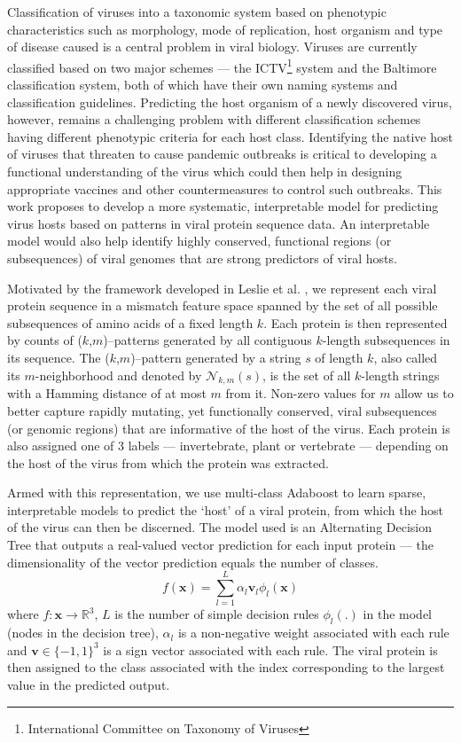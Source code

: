 Classification of viruses into a taxonomic system based on phenotypic characteristics
such as morphology, mode of replication, host organism and type of disease caused is
a central problem in viral biology. Viruses are currently classified based on two major
schemes --- the ICTV\footnote{International Committee on Taxonomy of Viruses} system
and the Baltimore classification system, both of which have their own naming systems
and classification guidelines. Predicting the host organism of a newly discovered virus,
however, remains a challenging problem with different classification schemes having
different phenotypic criteria for each host class. Identifying the native 
host of viruses that threaten to cause pandemic outbreaks is critical to developing a 
functional understanding of the virus which could then help in designing appropriate 
vaccines and other countermeasures to control such outbreaks. This work proposes to 
develop a more systematic, 
interpretable model for predicting virus hosts based on patterns in viral protein sequence data. 
An interpretable model would also help identify highly conserved, functional regions (or subsequences) 
of viral genomes that are strong predictors of viral hosts.

Motivated by the framework developed in Leslie et al. \cite{leslie}, we represent each viral protein
sequence in a mismatch feature space spanned by the set of all possible subsequences of amino acids
of a fixed length $k$. Each protein is then represented by counts of ($k$,$m$)--patterns
generated by all contiguous $k$-length subsequences in its sequence. The ($k$,$m$)--pattern 
generated by a string $s$ of length $k$, also called its $m$-neighborhood and denoted by 
$\mathcal{N}_{k,m}(s)$, is the set of all $k$-length strings with a Hamming distance of
at most $m$ from it. Non-zero values for $m$ allow us to better capture rapidly mutating, 
yet functionally conserved, viral subsequences (or genomic regions) that are informative 
of the host of the virus. Each protein is also assigned one of 3 labels --- invertebrate, plant
or vertebrate --- depending on the host of the virus from which the protein was extracted.

Armed with this representation, we use multi-class Adaboost\cite{adaboost, multiclass} to learn sparse, 
interpretable models to predict the `host' of a viral protein, from which the host of the virus can then
be discerned. The model used is an Alternating Decision Tree\cite{adts} that outputs a real-valued vector 
prediction for each input protein --- the dimensionality of the vector prediction equals the number of 
classes. 
\begin{equation}
f(\mathbf{x}) = \sum_{l=1}^{L} \alpha_l \mathbf{v}_l \phi_l(\mathbf{x})
\end{equation}
where $f : \mathbf{x} \rightarrow \mathbb{R}^3$, $L$ is the number of simple decision rules 
$\phi_l(.)$ in the model (nodes in the decision tree), $\alpha_l$ is a non-negative weight 
associated with each rule and $\mathbf{v} \in \{-1,1 \}^3$ is a sign vector associated with each 
rule. The viral protein is then assigned to the class associated with the index corresponding
to the largest value in the predicted output.

